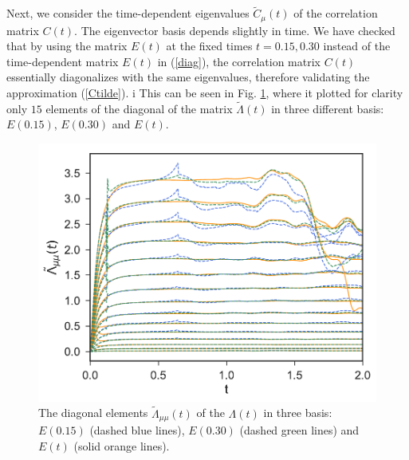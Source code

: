 \documentclass[b5paper,openright,11pt]{book}
\begin{document}
Next, we consider the time-dependent eigenvalues $\tilde{C}_\mu(t)$ of
the correlation matrix $C(t)$.  The eigenvector basis depends slightly
in time. We have checked that by  using the matrix $E(t)$ at the fixed
times  $t=0.15,0.30$  instead  of  the  time-dependent  matrix  $E(t)$  in
(\ref{diag}), the  correlation matrix $C(t)$  essentially diagonalizes
with  the same  eigenvalues,  therefore  validating the  approximation
(\ref{Ctilde}). i
This can be seen in Fig. \ref{fig:LambdatBasis-WALLS-66nodes}, 
where it plotted for clarity only $15$ elements of the diagonal of the matrix $\tilde{\Lambda}(t)$ in three different basis: 
$E(0.15)$, $E(0.30)$ and $E(t)$. 
\begin{figure}[h!]
  \centering
\includegraphics[scale=0.41]{LambdatBasis-WALLS-66nodes}
\caption[Diagonal elements  $\tilde{\Lambda}_{\mu\mu}(t)$ of $\Lambda(t)$ in three different basis - 66nodes.]{The  diagonal elements  $\tilde{\Lambda}_{\mu\mu}(t)$ of  the
  $\Lambda(t)$ in three basis:
$E(0.15)$ (dashed blue lines), $E(0.30)$ (dashed green lines) and $E(t)$ (solid orange lines). }
\label{fig:LambdatBasis-WALLS-66nodes}
\end{figure}
\end{document}
